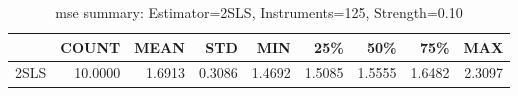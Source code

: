 \begin{table}[ht]
\centering
\caption{mse summary: Estimator=2SLS, Instruments=125, Strength=0.10}
\begin{tabular}{lrrrrrrrr}
\toprule
 & COUNT & MEAN & STD & MIN & 25\% & 50\% & 75\% & MAX \\
\midrule
2SLS & 10.0000 & 1.6913 & 0.3086 & 1.4692 & 1.5085 & 1.5555 & 1.6482 & 2.3097 \\
\bottomrule
\end{tabular}
\end{table}
